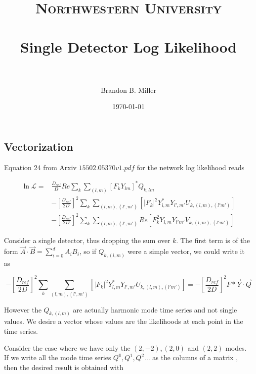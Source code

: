 \documentclass[paper=a4, fontsize=11pt]{scrartcl} %
\title{	
\normalfont \normalsize 
\textsc{Northwestern University} \\ [25pt] %
\horrule{0.5pt} \\[0.4cm] %
\huge Single Detector Log Likelihood \\ %
\horrule{2pt} \\[0.5cm] %
}
\author{Brandon B. Miller} %
\date{\normalsize\today} %
\numberwithin{equation}{section} %
\numberwithin{figure}{section} %
\numberwithin{table}{section} %
\begin{document}
\maketitle %

\subsection{Vectorization}
\renewcommand*{\arraystretch}{0.5}
Equation 24 from Arxiv $15502.05370v1.pdf$ for the network log likelihood reads 

\begin{equation}
\begin{align}
\ln{\mathcal{L}} = &\frac{D_{ref}}{D}Re \sum_{k}\sum_{(l,m)}\left[F_k Y_{lm}\right]^{*}Q_{k,lm} \\ 
& - \left[\frac{D_{ref}}{2D}\right]^{2}\sum_{k}\sum_{(l,m),(l',m')}\left[|F_k|^2 Y_{l,m}^{*}Y_{l',m'}U_{k,(l,m),(l'm')}\right] \\
 & - \left[\frac{D_{ref}}{2D}\right]^{2}\sum_{k}\sum_{(l,m),(l',m')}Re\left[  F_{k}^{2}Y_{l,m}Y_{l'm'}V_{k,(l,m),(l'm')}\right]
\end{align}
\end{equation}

Consider a single detector, thus dropping the sum over $k$. The first term is of the form $\vec{A}\cdot\vec{B} = \sum_{i=0}^{d}A_iB_i$, so if $Q_{k,(l,m)}$ were a simple vector, we could write it as

\begin{equation}
- \left[\frac{D_{ref}}{2D}\right]^{2}\sum_{k}\sum_{(l,m),(l',m')}\left[|F_k|^2 Y_{l,m}^{*}Y_{l',m'}U_{k,(l,m),(l'm')}\right] = - \left[\frac{D_{ref}}{2D}\right]^{2} F*\vec{Y}\cdot\vec{Q}
\end{equation}

However the $Q_{k,(l,m)}$ are actually harmonic mode time series and not single values. We desire a vector whose values are the likelihoods at each point in the time series. 

\newpage
Consider the case where we have only the $(2,-2), (2,0)$ and $(2,2)$ modes. If we write all the mode time series $Q^0, Q^1, Q^2...$ as the columns of a matrix , then the desired result is obtained with
\end{document}
